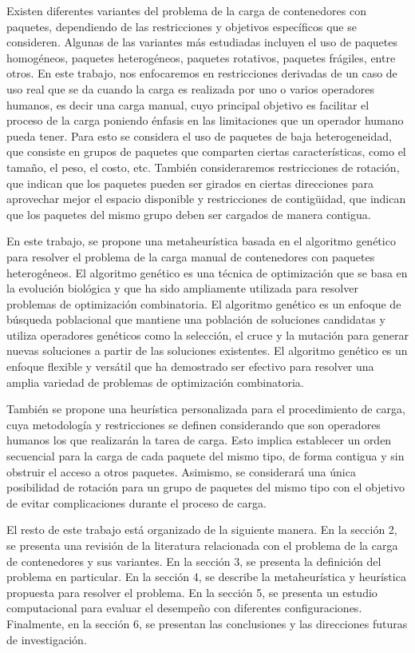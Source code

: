 Existen diferentes variantes del problema de la carga de contenedores con paquetes, dependiendo de las restricciones y objetivos específicos que se consideren. Algunas de las variantes más estudiadas incluyen el uso de paquetes homogéneos, paquetes heterogéneos, paquetes rotativos, paquetes frágiles, entre otros. En este trabajo, nos enfocaremos en restricciones derivadas de un caso de uso real que se da cuando la carga es realizada por uno o varios operadores humanos, es decir una carga manual, cuyo principal objetivo es facilitar el proceso de la carga poniendo énfasis en las limitaciones que un operador humano pueda tener. Para esto se considera el uso de paquetes de baja heterogeneidad, que consiste en grupos de paquetes que comparten ciertas características, como el tamaño, el peso, el costo, etc. También consideraremos restricciones de rotación, que indican que los paquetes pueden ser girados en ciertas direcciones para aprovechar mejor el espacio disponible y restricciones de contigüidad, que indican que los paquetes del mismo grupo deben ser cargados de manera contigua.

En este trabajo, se propone una metaheurística basada en el algoritmo genético para resolver el problema de la carga manual de contenedores con paquetes heterogéneos. El algoritmo genético es una técnica de optimización que se basa en la evolución biológica y que ha sido ampliamente utilizada para resolver problemas de optimización combinatoria. El algoritmo genético es un enfoque de búsqueda poblacional que mantiene una población de soluciones candidatas y utiliza operadores genéticos como la selección, el cruce y la mutación para generar nuevas soluciones a partir de las soluciones existentes. El algoritmo genético es un enfoque flexible y versátil que ha demostrado ser efectivo para resolver una amplia variedad de problemas de optimización combinatoria.

También se propone una heurística personalizada para el procedimiento de carga, cuya metodología y restricciones se definen considerando que son operadores humanos los que realizarán la tarea de carga. Esto implica establecer un orden secuencial para la carga de cada paquete del mismo tipo, de forma contigua y sin obstruir el acceso a otros paquetes. Asimismo, se considerará una única posibilidad de rotación para un grupo de paquetes del mismo tipo con el objetivo de evitar complicaciones durante el proceso de carga.

El resto de este trabajo está organizado de la siguiente manera. En la sección 2, se presenta una revisión de la literatura relacionada con el problema de la carga de contenedores y sus variantes. En la sección 3, se presenta la definición del problema en particular. En la sección 4, se describe la metaheurística y heurística propuesta para resolver el problema. En la sección 5, se presenta un estudio computacional para evaluar el desempeño con diferentes configuraciones. Finalmente, en la sección 6, se presentan las conclusiones y las direcciones futuras de investigación.
